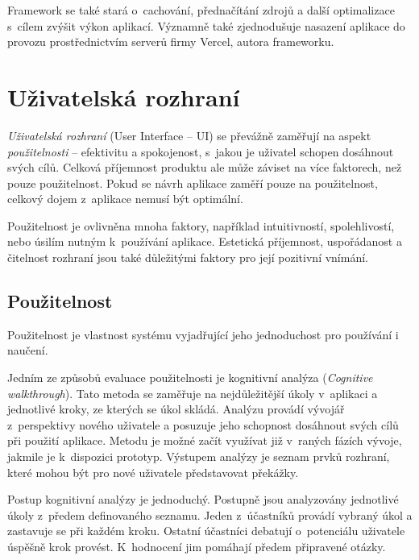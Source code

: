 Framework se také stará o~cachování, přednačítání zdrojů a další optimalizace s~cílem zvýšit výkon aplikací.
Významně také zjednodušuje nasazení aplikace do provozu prostřednictvím serverů firmy Vercel, autora frameworku. \cite{nextjsDocs}

\section{Uživatelská rozhraní}


\emph{Uživatelská rozhraní} (User Interface -- UI) se převážně zaměřují na aspekt \emph{použitelnosti} -- efektivitu a spokojenost, s~jakou je uživatel schopen dosáhnout svých cílů.
Celková příjemnost produktu ale může záviset na více faktorech, než pouze použitelnost.
Pokud se návrh aplikace zaměří pouze na použitelnost, celkový dojem z~aplikace nemusí být optimální. 
\cite{pleasureInProduct}

Použitelnost je ovlivněna mnoha faktory, například intuitivností, spolehlivostí, nebo úsilím nutným k~používání aplikace.
Estetická příjemnost, uspořádanost a čitelnost rozhraní jsou také důležitými faktory pro její pozitivní vnímání. \cite{webAesthetics}

\subsection{Použitelnost}

Použitelnost je vlastnost systému vyjadřující jeho jednoduchost pro používání i naučení.

Jedním ze způsobů evaluace použitelnosti je kognitivní analýza (\emph{Cognitive walkthrough}).
Tato metoda se zaměřuje na nejdůležitější úkoly v~aplikaci a jednotlivé kroky, ze kterých se úkol skládá.
Analýzu provádí vývojář z~perspektivy nového uživatele a posuzuje jeho schopnost dosáhnout svých cílů při použití aplikace.
Metodu je možné začít využívat již v~raných fázích vývoje, jakmile je k~dispozici prototyp.
Výstupem analýzy je seznam prvků rozhraní, které mohou být pro nové uživatele představovat překážky.
\cite{cognitiveWalkthrough}

Postup kognitivní analýzy je jednoduchý.
Postupně jsou analyzovány jednotlivé úkoly z~předem definovaného seznamu.
Jeden z~účastníků provádí vybraný úkol a zastavuje se při každém kroku.
Ostatní účastníci debatují o~potenciálu uživatele úspěšně krok provést.
K~hodnocení jim pomáhají předem připravené otázky.

